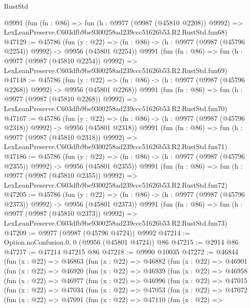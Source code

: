 \begin{lexlean}{RustStd}
\begin{coremodule}
    @9991
    (fun (fn : @86) =>
    fun (h : @9977 (@9987 (@45810 @2208)) @9992) =>
    LexLeanPreserve.C603dfb9be9300258ad239ccc51626b53.R2.RustStd.fun68)
@47129 := @45786
    (fun (y : @22) =>
    (fn : @86) -> (h : @9977 (@9987 (@45796 @2254)) @9992) -> @9956 (@45801 @2254))
    @9991
    (fun (fn : @86) =>
    fun (h : @9977 (@9987 (@45810 @2254)) @9992) =>
    LexLeanPreserve.C603dfb9be9300258ad239ccc51626b53.R2.RustStd.fun69)
@47148 := @45786
    (fun (y : @22) =>
    (fn : @86) -> (h : @9977 (@9987 (@45796 @2268)) @9992) -> @9956 (@45801 @2268))
    @9991
    (fun (fn : @86) =>
    fun (h : @9977 (@9987 (@45810 @2268)) @9992) =>
    LexLeanPreserve.C603dfb9be9300258ad239ccc51626b53.R2.RustStd.fun70)
@47167 := @45786
    (fun (y : @22) =>
    (fn : @86) -> (h : @9977 (@9987 (@45796 @2318)) @9992) -> @9956 (@45801 @2318))
    @9991
    (fun (fn : @86) =>
    fun (h : @9977 (@9987 (@45810 @2318)) @9992) =>
    LexLeanPreserve.C603dfb9be9300258ad239ccc51626b53.R2.RustStd.fun71)
@47186 := @45786
    (fun (y : @22) =>
    (fn : @86) -> (h : @9977 (@9987 (@45796 @2355)) @9992) -> @9956 (@45801 @2355))
    @9991
    (fun (fn : @86) =>
    fun (h : @9977 (@9987 (@45810 @2355)) @9992) =>
    LexLeanPreserve.C603dfb9be9300258ad239ccc51626b53.R2.RustStd.fun72)
@47205 := @45786
    (fun (y : @22) =>
    (fn : @86) -> (h : @9977 (@9987 (@45796 @2373)) @9992) -> @9956 (@45801 @2373))
    @9991
    (fun (fn : @86) =>
    fun (h : @9977 (@9987 (@45810 @2373)) @9992) =>
    LexLeanPreserve.C603dfb9be9300258ad239ccc51626b53.R2.RustStd.fun73)
@47209 := @9977 (@9987 (@45796 @4724)) @9992
@47214 := Option.noConfusion.{0, 0} (@9956 (@45801 @4724)) @86
@47215 := @2914 @86
@47217 := @47214 @47215 @86
@47218 := @9990 @10035
@47272 := @46844
    (fun (x : @22) =>
    @46863
      (fun (x : @22) =>
      @46882
        (fun (x : @22) =>
        @46901
          (fun (x : @22) =>
          @46920
            (fun (x : @22) =>
            @46939
              (fun (x : @22) =>
              @46958
                (fun (x : @22) =>
                @46977
                  (fun (x : @22) =>
                  @46996
                    (fun (x : @22) =>
                    @47015
                      (fun (x : @22) =>
                      @47034
                        (fun (x : @22) =>
                        @47053
                          (fun (x : @22) =>
                          @47072
                            (fun (x : @22) =>
                            @47091
                              (fun (x : @22) =>
                              @47110
                                (fun (x : @22) =>

\end{coremodule}
\end{lexlean}
